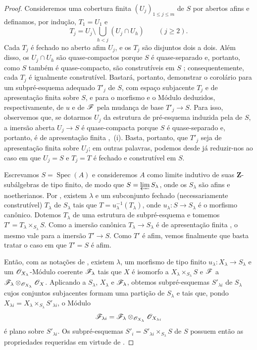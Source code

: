 \begin{proof}
Consideremos uma cobertura finita $(U_j)_{1\leqslant j\leqslant m}$ de $S$ por abertos afins e definamos, por indução, $T_1=U_1$ e
\[
T_j=U_j\setminus\bigcup_{h<j}(U_j\cap U_h)\qquad(j\geqslant 2).
\]
Cada $T_j$ é fechado no aberto afim $U_j$, e os $T_j$ são disjuntos dois a dois.
Além disso, os $U_j\cap U_h$ são quase-compactos porque $S$ é quase-separado e, portanto, como $S$ também é quase-compacto, são construtíveis em $S$ ; consequentemente, cada $T_j$ é igualmente construtível.
Bastará, portanto, demonstrar o corolário para um subpré-esquema adequado $T'_j$ de $S$, com espaço subjacente $T_j$ e de apresentação finita sobre $S$, e para o morfismo e o Módulo deduzidos, respectivamente, de $u$ e de $\mathscr{F}$ pela mudança de base $T'_j\to S$.
Para isso, observemos que, se dotarmos $U_j$ da estrutura de pré-esquema induzida pela de $S$, a imersão aberta $U_j\to S$ é quase-compacta porque $S$ é quase-separado  e, portanto, é de
apresentação finita ,~(i).
Basta, portanto, que $T'_j$ seja de apresentação finita sobre $U_j$; em outras palavras, podemos desde já reduzir-nos ao caso em que $U_j=S$ e $T_j=T$ é fechado e construtível em $S$.

Escrevamos $S=\operatorname{Spec}(A)$ e consideremos $A$ como limite indutivo de suas $\mathbf{Z}$-subálgebras de tipo finito, de modo que $S=\varprojlim S_\lambda$, onde os $S_\lambda$ são afins e noetherianos.
Por , existem $\lambda$ e um subconjunto fechado (necessariamente construtível) $T_\lambda$ de $S_\lambda$ tais que $T=u_\lambda^{-1}(T_\lambda)$, onde $u_\lambda:S\to S_\lambda$ é o morfismo canônico.
Dotemos $T_\lambda$ de uma estrutura de subpré-esquema e tomemos $T'=T_\lambda\times_{S_\lambda}S$.
Como a imersão canônica $T_\lambda\to S_\lambda$ é de apresentação finita , o mesmo vale para a imersão $T'\to S$.
Como $T'$ é afim, vemos finalmente que basta tratar o caso em que $T'=S$ é afim.

Então, com as notações de , existem $\lambda$, um morfismo de tipo finito $u_\lambda:X_\lambda\to S_\lambda$ e um $\mathscr{O}_{X_\lambda}$-Módulo coerente $\mathscr{F}_\lambda$ tais que $X$ é isomorfo a $X_\lambda\times_{S_\lambda}S$ e $\mathscr{F}$ a $\mathscr{F}_\lambda\otimes_{\mathscr{O}_{X_\lambda}}\mathscr{O}_X$.
Aplicando  a $S_\lambda$, $X_\lambda$ e $\mathscr{F}_\lambda$, obtemos subpré-esquemas $S'_{\lambda i}$ de $S_\lambda$ cujos conjuntos subjacentes formam uma partição de $S_\lambda$ e tais que, pondo $X_{\lambda i}=X_\lambda\times_{S_\lambda}S'_{\lambda i}$, o Módulo
\[
\mathscr{F}_{\lambda i}=\mathscr{F}_\lambda\otimes_{\mathscr{O}_{X_\lambda}}\mathscr{O}_{X_{\lambda i}}
\]
é plano sobre $S'_{\lambda i}$.
Os subpré-esquemas $S'_i=S'_{\lambda i}\times_{S_\lambda}S$ de $S$ possuem então as propriedades requeridas em virtude de .
\end{proof}

